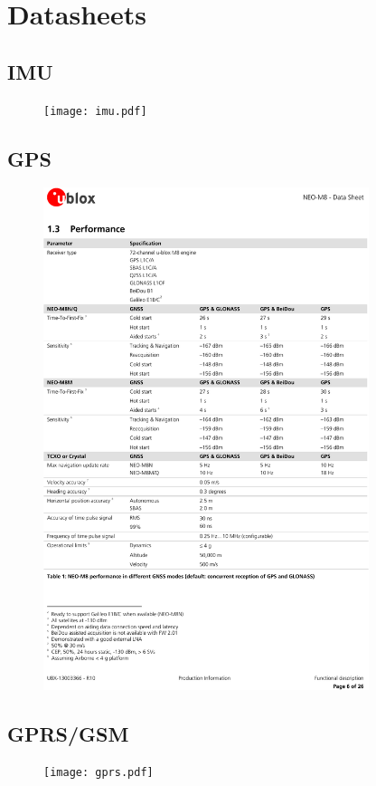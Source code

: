 \chapter{Datasheets}
\label{anexo:datasheets}

 \graphicspath{{Appendix1/Figuras/}{Appendix1/Figs/PDF/}{Appendix1/Figs/}}

\vspace{-10mm}
\section{IMU}
\begin{figure}[H]
\centering
\texttt{[image: imu.pdf]}
\end{figure}


\section{GPS}
\begin{figure}[H]
\centering
\includegraphics[width=0.85\textwidth]{gps.pdf}
\end{figure}


\section{GPRS/GSM}
\begin{figure}[H]
\centering
\texttt{[image: gprs.pdf]}
\end{figure}
